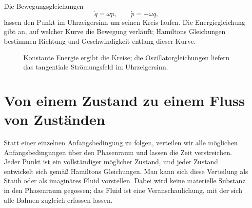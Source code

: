 Die Bewegungsgleichungen
\begin{equation}
  \dot q=\omega p,\qquad \dot p=-\omega q,
  \label{eq:l7-oscillator-flow}
\end{equation}
lassen den Punkt im Uhrzeigersinn um seinen Kreis laufen. Die Energiegleichung gibt an, auf welcher Kurve die Bewegung verläuft; Hamiltons Gleichungen bestimmen Richtung und Geschwindigkeit entlang dieser Kurve.

\begin{figure}[htbp]
  \centering
  \caption{Konstante Energie ergibt die Kreise; die Oszillatorgleichungen liefern das tangentiale Strömungsfeld im Uhrzeigersinn.}
\end{figure}

\begin{classroomqa}
\end{classroomqa}

\section{Von einem Zustand zu einem Fluss von Zuständen}

Statt einer einzelnen Anfangsbedingung zu folgen, verteilen wir alle möglichen Anfangsbedingungen über den Phasenraum und lassen die Zeit verstreichen. Jeder Punkt ist ein vollständiger möglicher Zustand, und jeder Zustand entwickelt sich gemäß Hamiltons Gleichungen. Man kann sich diese Verteilung als Staub oder als imaginäres Fluid vorstellen. Dabei wird keine materielle Substanz in den Phasenraum gegossen; das Fluid ist eine Veranschaulichung, mit der sich alle Bahnen zugleich erfassen lassen.

